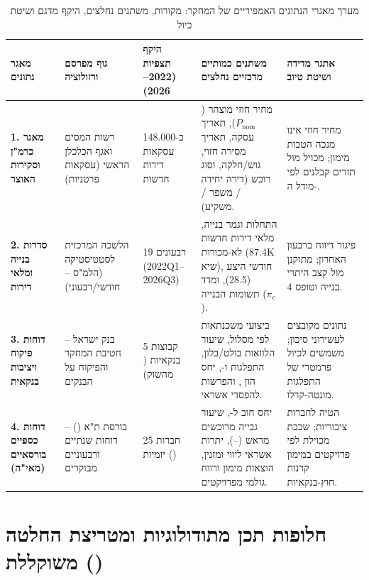 \begin{table}[htbp]
\caption{מערך מאגרי הנתונים האמפיריים של המחקר: מקורות, משתנים נחלצים, היקף מדגם ושיטת כיול \cite{ita2025carman,cbs2026dwellings,boi2025stability,mof2025economist}}
\label{tab:data_sources_schema}
\centering
\footnotesize
\renewcommand{\arraystretch}{1.26}
\begin{tabularx}{\textwidth}{R{2.3cm} R{2.8cm} R{2.2cm} Y R{2.4cm}}
\toprule
{}
\textbf{מאגר נתונים} & \textbf{גוף מפרסם ורזולוציה} & \textbf{היקף תצפיות (\num{2022}--\num{2026})} & \textbf{משתנים כמותיים מרכזיים נחלצים} & \textbf{אתגר מדידה ושיטת טיוב} \\
\midrule
\textbf{1. מאגר כרמ"ן וסקירות האוצר} & רשות המסים ואגף הכלכלן הראשי (עסקאות פרטניות) & כ-\num{148,000} עסקאות דירות חדשות & מחיר חוזי מוצהר ($P_{\text{nom}}$), תאריך עסקה, תאריך מסירה חזוי, גוש/חלקה, וסוג רוכש (דירה יחידה / משפר / משקיע). & מחיר חוזי אינו מנכה הטבות מימון; מכויל מול תזרים קבלנים לפי מודל ה-. \\
\textbf{2. סדרות בנייה ומלאי דירות} & הלשכה המרכזית לסטטיסטיקה (הלמ"ס – חודשי/רבעוני) & \num{19} רבעונים (\num{2022Q1}--\num{2026Q3}) & התחלות וגמר בנייה, מלאי דירות חדשות לא-מכורות (\num{87.4K} שיא), חודשי היצע (\num{28.5}), ומדד תשומות הבנייה ($\pi_c$). & פיגור דיווח ברבעון האחרון; מתוקנן מול קצב היתרי בנייה וטופס \num{4}. \\
\textbf{3. דוחות פיקוח ויציבות בנקאית} & בנק ישראל – חטיבת המחקר והפיקוח על הבנקים & \num{5} קבוצות בנקאיות ( מהשוק) & ביצועי משכנתאות לפי מסלול, שיעור הלוואות בולט/בלון, התפלגות  ו-, יחס הון , והפרשות להפסדי אשראי. & נתונים מקובצים לעשירוני סיכון; משמשים לכיול פרמטרי של התפלגות מונטה-קרלו. \\
\textbf{4. דוחות כספיים בורסאיים (מאי"ה)} & בורסת ת"א () – דוחות שנתיים ורבעוניים מבוקרים & \num{25} חברות יזמיות () & יחס חוב ל-, שיעור גבייה מרוכשים מראש (--), יתרות אשראי ליווי ומזנין, הוצאות מימון ורווח גולמי מפרויקטים. & הטיה לחברות ציבוריות; שכבת  מכוילת לפי פרויקטים במימון קרנות חוץ-בנקאיות. \\
\bottomrule
\end{tabularx}
\end{table}

\section{חלופות תכן מתודולוגיות ומטריצת החלטה משוקללת ()}
\label{sec:pugh_matrix}


